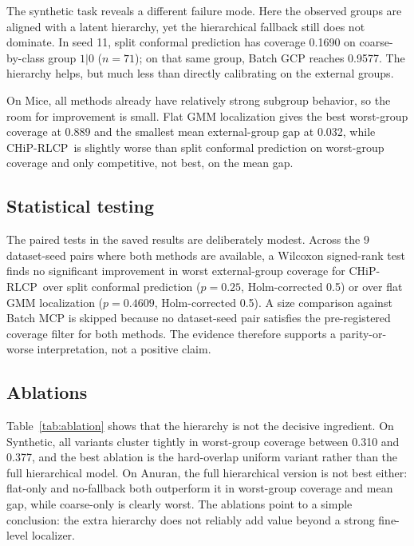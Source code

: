 \documentclass{article}
\newcommand{\chip}{CHiP-RLCP}
\begin{document}
The synthetic task reveals a different failure mode. Here the observed groups are aligned with a latent hierarchy, yet the hierarchical fallback still does not dominate. In seed 11, split conformal prediction has coverage 0.1690 on coarse-by-class group $1|0$ ($n=71$); on that same group, Batch GCP reaches 0.9577. The hierarchy helps, but much less than directly calibrating on the external groups.

On Mice, all methods already have relatively strong subgroup behavior, so the room for improvement is small. Flat GMM localization gives the best worst-group coverage at 0.889 and the smallest mean external-group gap at 0.032, while \chip\ is slightly worse than split conformal prediction on worst-group coverage and only competitive, not best, on the mean gap.

\subsection{Statistical testing}
The paired tests in the saved results are deliberately modest. Across the 9 dataset-seed pairs where both methods are available, a Wilcoxon signed-rank test finds no significant improvement in worst external-group coverage for \chip\ over split conformal prediction ($p=0.25$, Holm-corrected 0.5) or over flat GMM localization ($p=0.4609$, Holm-corrected 0.5). A size comparison against Batch MCP is skipped because no dataset-seed pair satisfies the pre-registered coverage filter for both methods. The evidence therefore supports a parity-or-worse interpretation, not a positive claim.

\subsection{Ablations}
Table~\ref{tab:ablation} shows that the hierarchy is not the decisive ingredient. On Synthetic, all variants cluster tightly in worst-group coverage between 0.310 and 0.377, and the best ablation is the hard-overlap uniform variant rather than the full hierarchical model. On Anuran, the full hierarchical version is not best either: flat-only and no-fallback both outperform it in worst-group coverage and mean gap, while coarse-only is clearly worst. The ablations point to a simple conclusion: the extra hierarchy does not reliably add value beyond a strong fine-level localizer.
\end{document}
